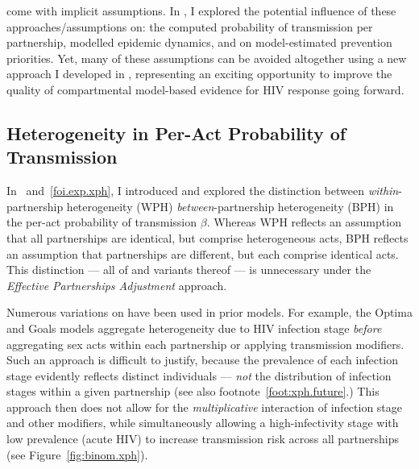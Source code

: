 come with implicit assumptions. %
In , I explored the potential influence of these approaches/assumptions on: %
the computed probability of transmission per partnership,
modelled epidemic dynamics, and on model-estimated prevention priorities.
Yet, many of these assumptions can be avoided altogether
using a new approach I developed in ,
representing an exciting opportunity to improve the quality of
compartmental model-based evidence for HIV response going forward.
\subsection{Heterogeneity in Per-Act Probability of Transmission}\label{foi.disc.xph} %
In ~and~\ref{foi.exp.xph}, I introduced and explored the distinction between
\emph{within}-partnership heterogeneity (WPH) \vs \emph{between}-partnership heterogeneity (BPH)
in the per-act probability of transmission $\beta$. Whereas
WPH reflects an assumption that all partnerships are identical, but comprise heterogeneous acts,
BPH reflects an assumption that partnerships are different, but each comprise identical acts.
This distinction --- \ie all of  and variants thereof ---
is unnecessary under the \emph{Effective Partnerships Adjustment} approach.
\par
Numerous variations on  have been used in prior models.
For example, the Optima \cite{Kerr2015} and Goals \cite{Stover2014} models
aggregate heterogeneity due to HIV infection stage
\emph{before} aggregating sex acts within each partnership or applying transmission modifiers.
Such an approach is difficult to justify, because
the prevalence of each infection stage evidently reflects distinct individuals
--- \emph{not} the distribution of infection stages within a given partnership
(see also footnote~\ref{foot:xph.future}.)
This approach then does not allow for
the \emph{multiplicative} interaction of infection stage and other modifiers,
while simultaneously allowing a high-infectivity stage with low prevalence (\eg acute HIV)
to increase transmission risk across all partnerships (see Figure~\ref{fig:binom.xph}).
